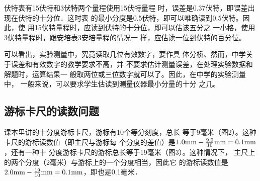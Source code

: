 伏特表有15伏特和3伏特两个量程使用15伏特量程
时，误差是0.37伏特，即误差出现在伏特的十分位．这时表
的最小分度是0.5伏特，即可以唯确读到0.5伏特。因此，使
用15伏特量程时，应读到伏特的十分位，即可以估该五分之
一小格，使用3伏特量程时，跟安培表3安培量程的情况一
样，应估读一位到伏特的百分位。

可以看出，实验测量中，究竟读取几位有效数字，要作具
体分桥、然而，中学关于误差和有效数字的教学要求不高，并
不要求估计测量误差，在处理实验数据和解题时，运算结果一
般取两位或三位数字就可以了。因此，在中学的实验测量中，
一般来说，可以要求学生估读到测量仪器最小分量的十分
之几。

\subsection{游标卡尺的读数问题}
课本里讲的十分度游标卡尺，游标有10个等分刻度，总长
等于9毫米（图2）。这种卡尺的游标读数值（即主尺与游标每
个分度的差值）是$1.0{\rm mm}-\frac{9.0}{10}{\rm mm}=0.1{\rm mm}$，还有一种十
分度游标卡尺的游标总长等于19毫米（图3）。这种情况下，
主尺上的两个分度（2毫米）与游标上的一个分度相当，因此它
的游标读数值是$2.0{\rm mm}-\frac{19}{10}{\rm mm}=0.1{\rm mm}$，即也是0.1毫米．

\begin{figure}[htp]\centering
    \begin{minipage}[t]{0.48\textwidth}
    \centering
{}
    \caption{}
    \end{minipage}
    \begin{minipage}[t]{0.48\textwidth}
    \centering
    \caption{}
    \end{minipage}
    \end{figure}



